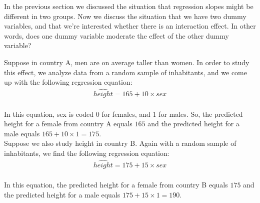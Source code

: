 \documentclass[]{report}\usepackage[]{graphicx}\usepackage[]{color}
\begin{document}
In the previous section we discussed the situation that regression slopes might be different in two groups. Now we discuss the situation that we have two dummy variables, and that we're interested whether there is an interaction effect. In other words, does one dummy variable moderate the effect of the other dummy variable?

Suppose in country A, men are on average taller than women. In order to study this effect, we analyze data from a random sample of inhabitants, and we come up with the following regression equation:
\\
\begin{eqnarray} 
\widehat{height} = 165 + 10  \times sex  \nonumber
\end{eqnarray}
\\
In this equation, sex is coded 0 for females, and 1 for males. So, the predicted height for a female from country A equals $165$ and the predicted height for a male equals $165 + 10 \times 1 = 175$.\\


Suppose we also study height in country B. Again with a random sample of inhabitants, we find the following regression equation:
\\
\begin{eqnarray} 
\widehat{height} = 175 + 15  \times sex  \nonumber
\end{eqnarray}
\\
In this equation, the predicted height for a female from country B equals $175$ and the predicted height for a male equals $175 + 15 \times 1 = 190$.\\
\end{document}
